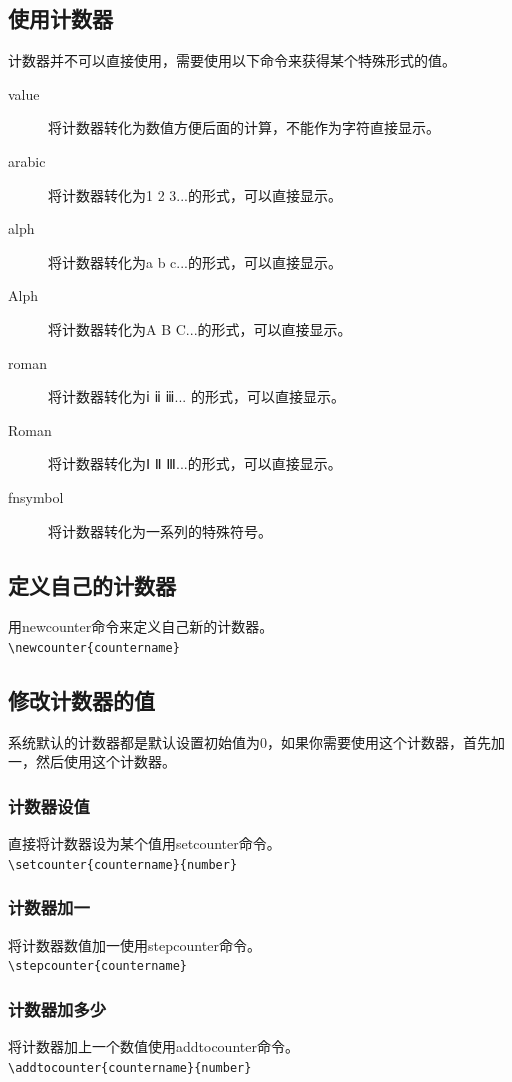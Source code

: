 \documentclass[11pt,oneside]{book}
\begin{document}
\begin{common-format}
\subsection{使用计数器}
计数器并不可以直接使用，需要使用以下命令来获得某个特殊形式的值。
\begin{description}
\item[value] 将计数器转化为数值方便后面的计算，不能作为字符直接显示。
\item[arabic] 将计数器转化为1 2 3...的形式，可以直接显示。
\item[alph] 将计数器转化为a b c...的形式，可以直接显示。
\item[Alph] 将计数器转化为A B C...的形式，可以直接显示。
\item[roman] 将计数器转化为ⅰ ⅱ ⅲ... 的形式，可以直接显示。
\item[Roman] 将计数器转化为Ⅰ Ⅱ Ⅲ...的形式，可以直接显示。
\item[fnsymbol] 将计数器转化为一系列的特殊符号。
\end{description}

\subsection{定义自己的计数器}
用newcounter命令来定义自己新的计数器。\\
\verb+\newcounter{countername}+

\subsection{修改计数器的值}
系统默认的计数器都是默认设置初始值为0，如果你需要使用这个计数器，首先加一，然后使用这个计数器。
\subsubsection{计数器设值}
直接将计数器设为某个值用setcounter命令。\\
\verb+\setcounter{countername}{number}+
\subsubsection{计数器加一}
将计数器数值加一使用stepcounter命令。\\
\verb+\stepcounter{countername}+

\subsubsection{计数器加多少}
将计数器加上一个数值使用addtocounter命令。\\
\verb+\addtocounter{countername}{number}+


\end{common-format}
\end{document}
